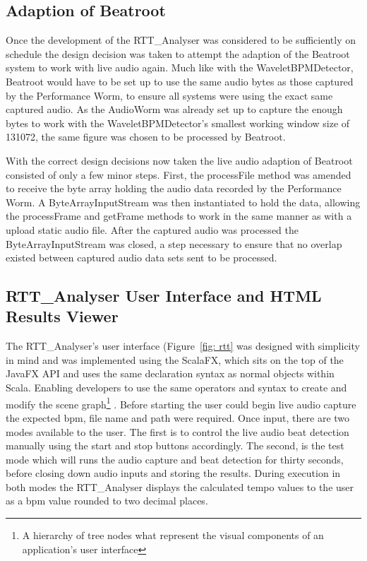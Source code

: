 \documentclass[a4paper, 11pt]{article}
\begin{document}
\subsection{Adaption of Beatroot}
Once the development of the RTT\_Analyser was considered to be sufficiently on schedule the design decision was taken to attempt the adaption of the Beatroot system to work with live audio again. Much like with the WaveletBPMDetector, Beatroot would have to be set up to use the same audio bytes as those captured by the Performance Worm, to ensure all systems were using the exact same captured audio. As the AudioWorm was already set up to capture the enough bytes to work with the WaveletBPMDetector's smallest working window size of 131072, the same figure was chosen to be processed by Beatroot. \par
With the correct design decisions now taken the live audio adaption of Beatroot consisted of only a few minor steps. First, the processFile method was amended to receive the byte array holding the audio data recorded by the Performance Worm. A ByteArrayInputStream was then instantiated to hold the data, allowing the processFrame and getFrame methods to work in the same manner as with a upload static audio file. After the captured audio was processed the ByteArrayInputStream was closed, a step necessary to ensure that no overlap existed between captured audio data sets sent to be processed.

\subsection{RTT\_Analyser User Interface and HTML Results Viewer}
The RTT\_Analyser's user interface (Figure~\ref{fig: rtt} was designed with simplicity in mind and was implemented using the ScalaFX, which sits on the top of the JavaFX API and uses the same declaration syntax as normal objects within Scala. Enabling developers to use the same operators and syntax to create and modify the scene graph\footnote{A hierarchy of tree nodes what represent the visual components of an application's user interface\cite{oracle2}} \cite{scalafx}. Before starting the user could begin live audio capture the expected bpm, file name and path were required. Once input, there are two modes available to the user. The first is to control the live audio beat detection manually using the start and stop buttons accordingly. The second, is the test mode which will runs the audio capture and beat detection for thirty seconds, before closing down audio inputs and storing the results. During execution in both modes the RTT\_Analyser displays the calculated tempo values to the user as a bpm value rounded to two decimal places. \par
\end{document}
